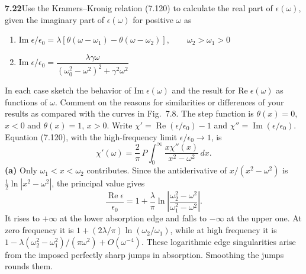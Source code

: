 \par\bigskip
\noindent\textbf{7.22}\quad Use the Kramers--Kronig relation (7.120) to calculate the real part of $\epsilon(\omega)$, given the imaginary part of $\epsilon(\omega)$ for positive $\omega$ as
\begin{enumerate}
\item[(a)] $\mathrm{Im}\;\epsilon/\epsilon_{0}=\lambda[\theta(\omega-\omega_{1})-\theta(\omega-\omega_{2})],\qquad\omega_{2}>\omega_{1}>0$
\item[(b)] $\mathrm{Im}\;\epsilon/\epsilon_{0}=\dfrac{\lambda\gamma\omega}{(\omega_{0}^{2}-\omega^{2})^{2}+\gamma^{2}\omega^{2}}$
\end{enumerate}
In each case sketch the behavior of $\mathrm{Im}\;\epsilon(\omega)$ and the result for $\mathrm{Re}\;\epsilon(\omega)$ as functions of $\omega$. Comment on the reasons for similarities or differences of your results as compared with the curves in Fig.~7.8. The step function is $\theta(x)=0$, $x<0$ and $\theta(x)=1$, $x>0$.
\solution
Write $\chi'=\operatorname{Re}(\epsilon/\epsilon_0)-1$ and
$\chi''=\operatorname{Im}(\epsilon/\epsilon_0)$. Equation (7.120),
with the high-frequency limit $\epsilon/\epsilon_0\to1$, is
\[
\chi'(\omega)=\frac2\pi\,P\int_0^\infty
\frac{x\chi''(x)}{x^2-\omega^2}\,dx.
\]
\textbf{(a)} Only $\omega_1<x<\omega_2$ contributes. Since the
antiderivative of $x/(x^2-\omega^2)$ is
$\tfrac12\ln|x^2-\omega^2|$, the principal value gives
\[
\boxed{\frac{\operatorname{Re}\epsilon}{\epsilon_0}
=1+\frac\lambda\pi\ln\left|
\frac{\omega_2^2-\omega^2}{\omega_1^2-\omega^2}\right|.}
\]
It rises to $+\infty$ at the lower absorption edge and falls to
$-\infty$ at the upper one. At zero frequency it is
$1+(2\lambda/\pi)\ln(\omega_2/\omega_1)$, while at high frequency
it is $1-\lambda(\omega_2^2-\omega_1^2)/(\pi\omega^2)+O(\omega^{-4})$.
These logarithmic edge singularities arise from the imposed perfectly
sharp jumps in absorption. Smoothing the jumps rounds them.

